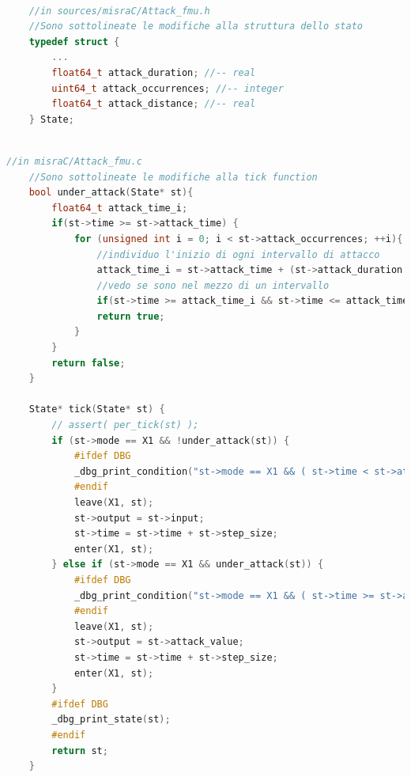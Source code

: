\begin{lstlisting}[language=C++]
	
	//in sources/misraC/Attack_fmu.h
	//Sono sottolineate le modifiche alla struttura dello stato
	typedef struct { 
		...
		float64_t attack_duration; //-- real
		uint64_t attack_occurrences; //-- integer
		float64_t attack_distance; //-- real
	} State;
	
\end{lstlisting}
\begin{lstlisting}[language=C++]
	//in misraC/Attack_fmu.c
	//Sono sottolineate le modifiche alla tick function
	bool under_attack(State* st){
		float64_t attack_time_i;
		if(st->time >= st->attack_time) {
			for (unsigned int i = 0; i < st->attack_occurrences; ++i){
				//individuo l'inizio di ogni intervallo di attacco
				attack_time_i = st->attack_time + (st->attack_duration + st->attack_distance)*i;
				//vedo se sono nel mezzo di un intervallo
				if(st->time >= attack_time_i && st->time <= attack_time_i + st->attack_duration)
				return true;
			}
		}
		return false;
	}
	
	State* tick(State* st) {
		// assert( per_tick(st) );
		if (st->mode == X1 && !under_attack(st)) {
			#ifdef DBG
			_dbg_print_condition("st->mode == X1 && ( st->time < st->attack_time )");
			#endif
			leave(X1, st);
			st->output = st->input;
			st->time = st->time + st->step_size;
			enter(X1, st);
		} else if (st->mode == X1 && under_attack(st)) {
			#ifdef DBG
			_dbg_print_condition("st->mode == X1 && ( st->time >= st->attack_time )");
			#endif
			leave(X1, st);
			st->output = st->attack_value;
			st->time = st->time + st->step_size;
			enter(X1, st);
		}
		#ifdef DBG
		_dbg_print_state(st);
		#endif
		return st;
	}
\end{lstlisting}